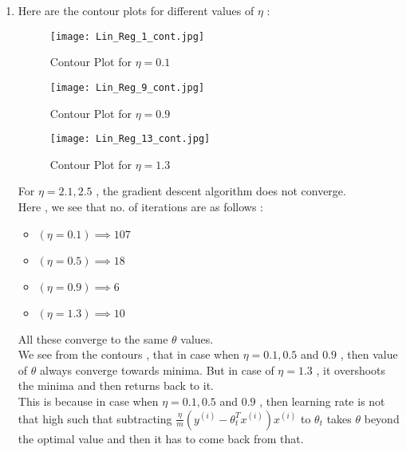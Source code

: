\documentclass{article}
\begin{document}
\begin{enumerate}[label=(\alph*)]
    \item Here are the contour plots for different values of $\eta$ : 
         \begin{figure}[H]
         \begin{minipage}{0.49 \textwidth}
            \texttt{[image: Lin\_Reg\_1\_cont.jpg]}
            \caption{Contour Plot for $\eta = 0.1$}
            \label{Linear_Reg_Cont_5}
         \end{minipage}
         \begin{minipage}{0.49 \textwidth}
            \texttt{[image: Lin\_Reg\_9\_cont.jpg]}
            \caption{Contour Plot for $\eta = 0.9$}
            \label{Linear_Reg_Cont_9}
            \end{minipage}
         \end{figure}
         \begin{figure}[H]
            \centering
            \texttt{[image: Lin\_Reg\_13\_cont.jpg]}
            \caption{Contour Plot for $\eta = 1.3$}
            \label{Linear_Reg_Cont_13}
         \end{figure}
         
         For $ \eta = 2.1 , 2.5$ , the gradient descent algorithm does not converge.
         \\
         
         Here , we see that no. of iterations are as follows :
         \begin{itemize}
             \item $(\eta = 0.1) \implies 107$
             \item $(\eta = 0.5) \implies 18$
             \item $(\eta = 0.9) \implies 6$
             \item $(\eta = 1.3) \implies 10$
         \end{itemize}
         All these converge to the same $\theta$ values.\\
         We see from the contours , that in case when $\eta = 0.1 , 0.5$ and $0.9$ , then value of $\theta$ always converge towards minima. But in case of $\eta = 1.3$ , it overshoots the minima and then returns back to it.\\ 
         
         This is because in case when $\eta = 0.1 , 0.5$ and $0.9$ , then learning rate is not that high such that subtracting $\frac {\eta}{m} (y^{(i)} - \theta ^T_t x^{(i)})x^{(i)}$ to $\theta _t$ takes $\theta$ beyond the optimal value and then it has to come back from that.\\ 
         

\end{enumerate}
\end{document}
